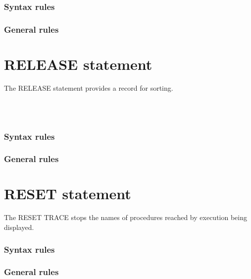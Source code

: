 \subsubsection{Syntax rules}

\subsubsection{General rules}

\section{RELEASE statement}

The RELEASE statement provides a record for sorting.

\begin{syntax}
   \identifier
  \begin{0-1}
    \begin{1=}
      \identifier \\
      \literal \\
    \end{1=}
  \end{0-1}
\end{syntax}

\subsubsection{Syntax rules}

\subsubsection{General rules}

\section{RESET statement}

The RESET TRACE stops the names of procedures reached by execution being displayed.

\begin{syntax}[\miscextcolour]
   
\end{syntax}

\subsubsection{Syntax rules}

\subsubsection{General rules}

